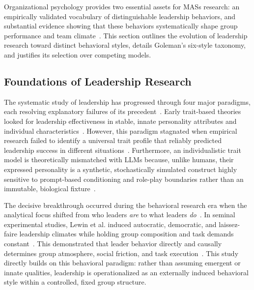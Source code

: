Organizational psychology provides two essential assets for \acp{MAS} research: 
an empirically validated vocabulary of distinguishable leadership behaviors, and substantial evidence showing that these behaviors systematically shape group performance and team climate~\cite{mathieu2017teamwork, goleman2000leadership, wageman2005teamdiagnosticsurvey}.
This section outlines the evolution of leadership research toward distinct behavioral styles, details Goleman's six-style taxonomy, and justifies its selection over competing models.

\subsection{Foundations of Leadership Research}
\label{subsec:foundations-leadership}

The systematic study of leadership has progressed through four major paradigms, each resolving explanatory failures of its precedent~\cite{mathieu2017teamwork, judge2002personality, judge2004transformationalleadership}.
Early trait-based theories looked for leadership effectiveness in stable, innate personality attributes and individual characteristics~\cite{judge2002personality}.
However, this paradigm stagnated when empirical research failed to identify a universal trait profile that reliably predicted leadership success in different situations~\cite{judge2002personality, ayman1995contingency}.
Furthermore, an individualistic trait model is theoretically mismatched with \acp{LLM} because, unlike humans, their expressed personality is a synthetic, stochastically simulated construct highly sensitive to prompt-based conditioning and role-play boundaries rather than an immutable, biological fixture~\cite{serapiogarcia2025personalitytraitslargelanguage, shanahan2023roleplaylargelanguagemodels, lacava2025openmodelsclosedminds}.

The decisive breakthrough occurred during the behavioral research era when the analytical focus shifted from who leaders \emph{are} to what leaders \emph{do}~\cite{lewin1939patterns, mathieu2017teamwork}.
In seminal experimental studies, Lewin et al. induced autocratic, democratic, and laissez-faire leadership climates while holding group composition and task demands constant~\cite{lewin1939patterns}.
This demonstrated that leader behavior directly and causally determines group atmosphere, social friction, and task execution~\cite{lewin1939patterns}.
This study directly builds on this behavioral paradigm: 
rather than assuming emergent or innate qualities, leadership is operationalized as an externally induced behavioral style within a controlled, fixed group structure.

